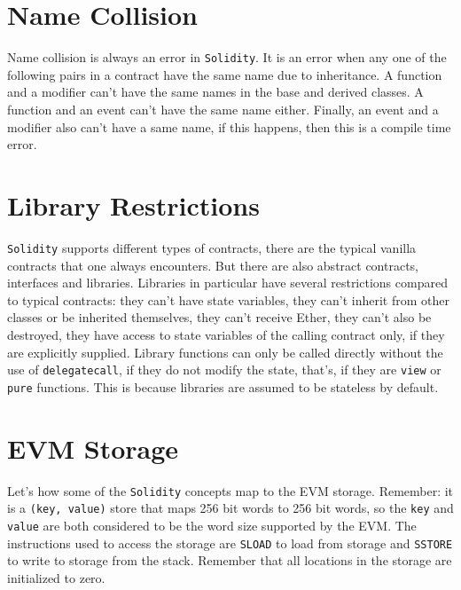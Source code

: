 \section{Name Collision}
Name collision is always an error in \verb|Solidity|. It is an error when any one of the following pairs in a contract have the same name due to inheritance. A function and a modifier can't have the same names in the base and derived classes. A function and an event can't have the same name either. Finally, an event and a modifier also can't have a same name, if this happens, then this is a compile time error.

\section{Library Restrictions}
\verb|Solidity| supports different types of contracts, there are the typical vanilla contracts that one always encounters. But there are also abstract contracts, interfaces and libraries. Libraries in particular have several restrictions compared to typical contracts: they can't have state variables, they can't inherit from other classes or be inherited themselves, they can't receive Ether, they can't also be destroyed, they have access to state variables of the calling contract only, if they are explicitly supplied. Library functions can only be called directly without the use of \verb|delegatecall|, if they do not modify the state, that's, if they are \verb|view| or \verb|pure| functions. This is because libraries are assumed to be stateless by default.

\section{EVM Storage}
Let's how some of the \verb|Solidity| concepts map to the EVM storage. Remember: it is a \verb|(key, value)| store that maps 256 bit words to 256 bit words, so the \verb|key| and \verb|value| are both considered to be the word size supported by the EVM. The instructions used to access the storage are \verb|SLOAD| to load from storage and \verb|SSTORE| to write to storage from the stack. Remember that all locations in the storage are initialized to zero.

